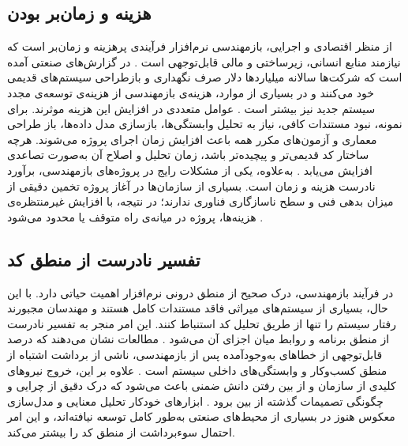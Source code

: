 \subsection*{هزینه و زمان‌بر بودن}
از منظر اقتصادی و اجرایی، بازمهندسی نرم‌افزار فرآیندی پرهزینه و زمان‌بر است که نیازمند منابع انسانی، زیرساختی و مالی قابل‌توجهی است \cite{recordpoint2024}. در گزارش‌های صنعتی آمده است که شرکت‌ها سالانه میلیاردها دلار صرف نگهداری و بازطراحی سیستم‌های قدیمی خود می‌کنند و در بسیاری از موارد، هزینه‌ی بازمهندسی از هزینه‌ی توسعه‌ی مجدد سیستم جدید نیز بیشتر است \cite{vfunction2022}. 
عوامل متعددی در افزایش این هزینه موثرند. برای نمونه، نبود مستندات کافی، نیاز به تحلیل وابستگی‌ها، بازسازی مدل داده‌ها، باز طراحی معماری و آزمون‌های مکرر همه باعث افزایش زمان اجرای پروژه می‌شوند. هرچه ساختار کد قدیمی‌تر و پیچیده‌تر باشد، زمان تحلیل و اصلاح آن به‌صورت تصاعدی افزایش می‌یابد \cite{modlogix2022}. 
به‌علاوه، یکی از مشکلات رایج در پروژه‌های بازمهندسی، برآورد نادرست هزینه و زمان است. بسیاری از سازمان‌ها در آغاز پروژه تخمین دقیقی از میزان بدهی فنی و سطح ناسازگاری فناوری ندارند؛ در نتیجه، با افزایش غیرمنتظره‌ی هزینه‌ها، پروژه در میانه‌ی راه متوقف یا محدود می‌شود \cite{devsquad2025}. 

\subsection*{تفسیر نادرست از منطق کد}
در فرآیند بازمهندسی، درک صحیح از منطق درونی نرم‌افزار اهمیت حیاتی دارد. با این حال، بسیاری از سیستم‌های میراثی فاقد مستندات کامل هستند و مهندسان مجبورند رفتار سیستم را تنها از طریق تحلیل کد استنباط کنند. این امر منجر به تفسیر نادرست از منطق برنامه و روابط میان اجزای آن می‌شود \cite{medium2023}.
مطالعات نشان می‌دهند که درصد قابل‌توجهی از خطاهای به‌وجود‌آمده پس از بازمهندسی، ناشی از برداشت اشتباه از منطق کسب‌وکار و وابستگی‌های داخلی سیستم است \cite{modelcode2024}. 
علاوه بر این، خروج نیروهای کلیدی از سازمان و از بین رفتن دانش ضمنی باعث می‌شود که درک دقیق از چرایی و چگونگی تصمیمات گذشته از بین برود \cite{joiv2023}. ابزارهای خودکار تحلیل معنایی و مدل‌سازی معکوس هنوز در بسیاری از محیط‌های صنعتی به‌طور کامل توسعه نیافته‌اند، و این امر احتمال سوء‌برداشت از منطق کد را بیشتر می‌کند.

